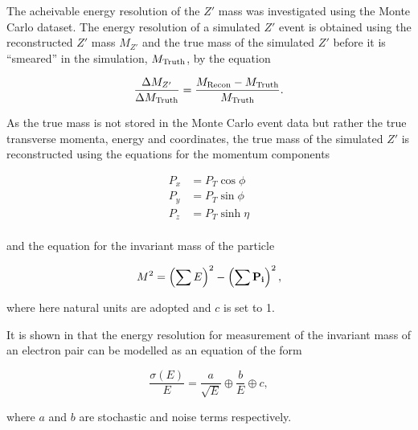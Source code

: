\documentclass{article}
\begin{document}

The acheivable energy resolution of the $Z'$ mass was investigated using the Monte Carlo dataset. The energy resolution of a simulated $Z'$ event is obtained using the reconstructed $Z'$ mass $M_{Z'}$ and the true mass of the simulated $Z'$ before it is ``smeared'' in the simulation, $M_{\rm{Truth}}$, by the equation

\begin{equation}
\frac{\Delta M_{Z'}}{\Delta M_{\rm{Truth}}} = \frac{M_{\rm{Recon}}-M_{\rm{Truth}}}{M_{\rm{Truth}}}.
\end{equation}

As the true mass is not stored in the Monte Carlo event data but rather the true transverse momenta, energy and coordinates, the true mass of  the simulated $Z'$ is reconstructed using the equations for the momentum components

\begin{equation}
\begin{split}
P_x & = P_T \cos\phi \\
P_y & = P_T \sin\phi \\
P_z & = P_T\sinh\eta \\
\end{split}
\end{equation}

and the equation for the invariant mass of the particle

\begin{equation}
M^2 = \left(\sum E\right)^2 - \left(\sum \bf{P}_i\right)^2,
\end{equation}

where here natural units are adopted and $c$ is set to 1. 

It is shown in \cite{ATLASResolutionEquation} that the energy resolution for measurement of the invariant mass of an electron pair can be modelled as an equation of the form

\begin{equation}
\frac{\sigma(E)}{E} = \frac{a}{\sqrt{E}} \oplus \frac{b}{E} \oplus c,
\end{equation}

where $a$ and $b$ are stochastic and noise terms respectively.
\end{document}

